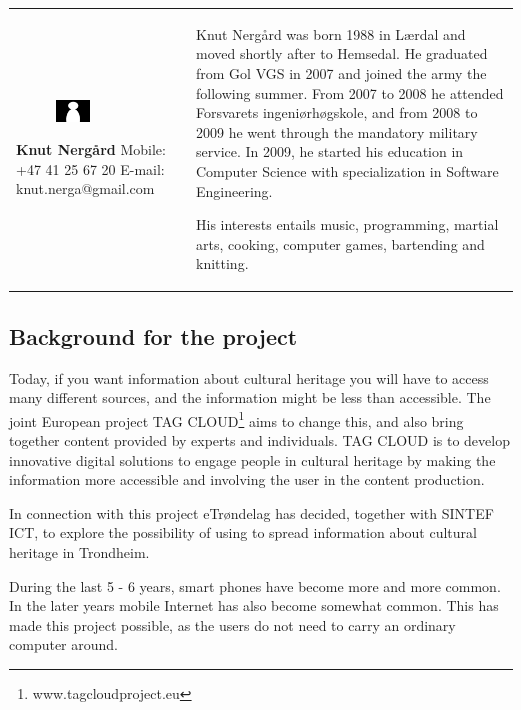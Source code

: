 \documentclass[11pt]{book}
\begin{document}
\begin{table}[H]
\centering
\begin{tabular}{ p{7cm} p{7cm} }
\parbox{7cm}{
\begin{figure}[H]
      \includegraphics[width=0.4\textwidth]{Figures/Person.png}
      \label{fig:partners_group_knut}
\end{figure}
\textbf{Knut Nergård}\\
Mobile: +47 41 25 67 20\\
E-mail: knut.nerga@gmail.com} & \parbox{7cm}{
Knut Nergård was born 1988 in Lærdal and moved shortly after to Hemsedal. He graduated from Gol VGS in 2007 and joined the army the following summer. From 2007 to 2008 he attended Forsvarets ingeniørhøgskole, and from 2008 to 2009 he went through the mandatory military service. In 2009, he started his education in Computer Science with specialization in Software Engineering. 

His interests entails music, programming, martial arts, cooking, computer games, bartending and knitting.
}
\end{tabular}
\label{tab:partners_group_knut}
\end{table}


\subsection{Background for the project}
Today, if you want information about cultural heritage you will have to access many different sources, and the information might be less than accessible. The joint European project TAG CLOUD\footnote{www.tagcloudproject.eu} aims to change this, and also bring together content provided by experts and individuals. TAG CLOUD is to develop innovative digital solutions to engage people in cultural heritage by making the information more accessible and involving the user in the content production.

In connection with this project eTrøndelag has decided, together with SINTEF ICT, to explore the possibility of using \shortprojectname to spread information about cultural heritage in Trondheim.

During the last 5 - 6 years, smart phones have become more and more common. In the later years mobile Internet has also become somewhat common. This has made this project possible, as the users do not need to carry an ordinary computer around.
\end{document}
